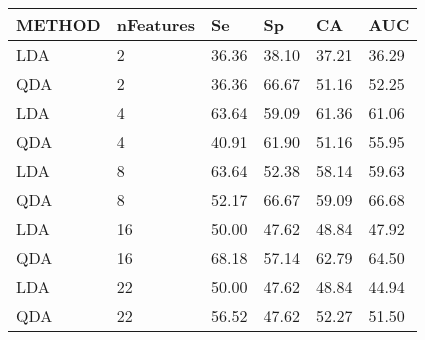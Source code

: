 \begin{table}[!ht]
    \centering
    \begin{tabular}{|l|l|l|l|l|l|}
    \hline
        METHOD & nFeatures & Se & Sp & CA & AUC \\ \hline
        LDA & 2 & 36.36 & 38.10 & 37.21 & 36.29 \\ \hline
        QDA & 2 & 36.36 & 66.67 & 51.16 & 52.25 \\ \hline
        LDA & 4 & 63.64 & 59.09 & 61.36 & 61.06 \\ \hline
        QDA & 4 & 40.91 & 61.90 & 51.16 & 55.95 \\ \hline
        LDA & 8 & 63.64 & 52.38 & 58.14 & 59.63 \\ \hline
        QDA & 8 & 52.17 & 66.67 & 59.09 & 66.68 \\ \hline
        LDA & 16 & 50.00 & 47.62 & 48.84 & 47.92 \\ \hline
        QDA & 16 & 68.18 & 57.14 & 62.79 & 64.50 \\ \hline
        LDA & 22 & 50.00 & 47.62 & 48.84 & 44.94 \\ \hline
        QDA & 22 & 56.52 & 47.62 & 52.27 & 51.50 \\ \hline
    \end{tabular}
\end{table}